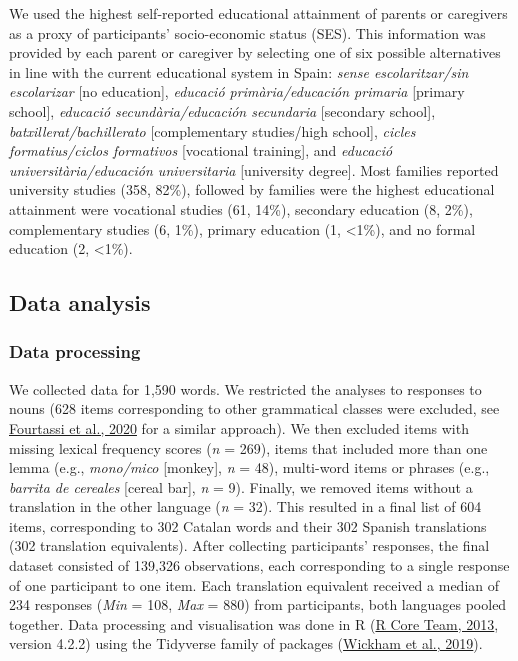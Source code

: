 \documentclass[
]{article}
\begin{document}
We used the highest self-reported educational attainment of parents or
caregivers as a proxy of participants' socio-economic status (SES). This
information was provided by each parent or caregiver by selecting one of
six possible alternatives in line with the current educational system in
Spain: \emph{sense escolaritzar/sin escolarizar} {[}no education{]},
\emph{educació primària/educación primaria} {[}primary school{]},
\emph{educació secundària/educación secundaria} {[}secondary school{]},
\emph{batxillerat/bachillerato} {[}complementary studies/high school{]},
\emph{cicles formatius/ciclos formativos} {[}vocational training{]}, and
\emph{educació universitària/educación universitaria} {[}university
degree{]}. Most families reported university studies (358, 82\%),
followed by families were the highest educational attainment were
vocational studies (61, 14\%), secondary education (8, 2\%),
complementary studies (6, 1\%), primary education (1, \textless1\%), and
no formal education (2, \textless1\%).

\hypertarget{sec-analysis}{%
\subsection{Data analysis}\label{sec-analysis}}

\hypertarget{data-processing}{%
\subsubsection{Data processing}\label{data-processing}}

We collected data for 1,590 words. We restricted the analyses to
responses to nouns (628 items corresponding to other grammatical classes
were excluded, see \protect\hyperlink{ref-fourtassi2020growth}{Fourtassi
et al., 2020} for a similar approach). We then excluded items with
missing lexical frequency scores (\emph{n} = 269), items that included
more than one lemma (e.g., \emph{mono/mico} {[}monkey{]}, \emph{n} =
48), multi-word items or phrases (e.g., \emph{barrita de cereales}
{[}cereal bar{]}, \emph{n} = 9). Finally, we removed items without a
translation in the other language (\emph{n} = 32). This resulted in a
final list of 604 items, corresponding to 302 Catalan words and their
302 Spanish translations (302 translation equivalents). After collecting
participants' responses, the final dataset consisted of 139,326
observations, each corresponding to a single response of one participant
to one item. Each translation equivalent received a median of 234
responses (\emph{Min} = 108, \emph{Max} = 880) from participants, both
languages pooled together. Data processing and visualisation was done in
R (\protect\hyperlink{ref-rcoreteam2013language}{R Core Team, 2013},
version 4.2.2) using the Tidyverse family of packages
(\protect\hyperlink{ref-wickham2019welcome}{Wickham et al., 2019}).
\end{document}
